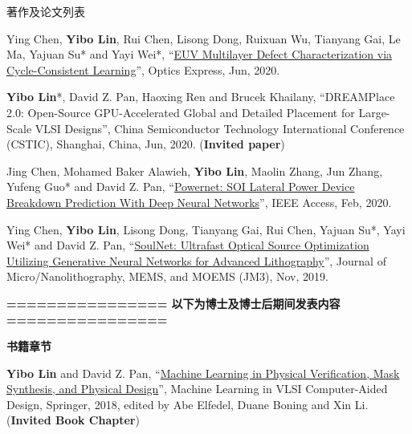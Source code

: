 \begin{rSection}{著作及论文列表}
\begin{description}[font=\normalfont, rightmargin=2em]
{}
            

\item[{[J56]}]{
        Ying Chen, \textbf{Yibo Lin}, Rui Chen, Lisong Dong, Ruixuan Wu, Tianyang Gai, Le Ma, Yajuan Su* and Yayi Wei*, 
    ``\href{https://doi.org/10.1364/OE.394590}{EUV Multilayer Defect Characterization via Cycle-Consistent Learning}'', 
    Optics Express, Jun, 2020.
    
}
            

\item[{[C55]}]{
        \textbf{Yibo Lin}*, David Z. Pan, Haoxing Ren and Brucek Khailany, 
    ``DREAMPlace 2.0: Open-Source GPU-Accelerated Global and Detailed Placement for Large-Scale VLSI Designs'', 
    China Semiconductor Technology International Conference (CSTIC), Shanghai, China, Jun, 2020.
    (\textbf{Invited paper})
}
            

\item[{[J54]}]{
        Jing Chen, Mohamed Baker Alawieh, \textbf{Yibo Lin}, Maolin Zhang, Jun Zhang, Yufeng Guo* and David Z. Pan, 
    ``\href{https://doi.org/10.1109/ACCESS.2020.2970966}{Powernet: SOI Lateral Power Device Breakdown Prediction With Deep Neural Networks}'', 
    IEEE Access, Feb, 2020.
    
}
            

\item[{[J53]}]{
        Ying Chen, \textbf{Yibo Lin}, Lisong Dong, Tianyang Gai, Rui Chen, Yajuan Su*, Yayi Wei* and David Z. Pan, 
    ``\href{https://dx.doi.org/10.1117/1.JMM.18.4.043506}{SoulNet: Ultrafast Optical Source Optimization Utilizing Generative Neural Networks for Advanced Lithography}'', 
    Journal of Micro/Nanolithography, MEMS, and MOEMS (JM3), Nov, 2019.
    
}
            

\end{description}
    

\begin{description}[font=\normalfont, rightmargin=2em]
    \item \textbf{================ 以下为博士及博士后期间发表内容 ================}
\end{description}
        

\textbf{书籍章节}
        

\begin{description}[font=\normalfont, rightmargin=2em]
    

\item[{[B1]}]{
        \textbf{Yibo Lin} and David Z. Pan, 
    ``\href{http://dx.doi.org/10.1007/978-3-030-04666-8_4}{Machine Learning in Physical Verification, Mask Synthesis, and Physical Design}'', 
    Machine Learning in VLSI Computer-Aided Design, Springer, 2018, edited by Abe Elfedel, Duane Boning and Xin Li.
    (\textbf{Invited Book Chapter})
}
            


\end{description}
\end{rSection}
